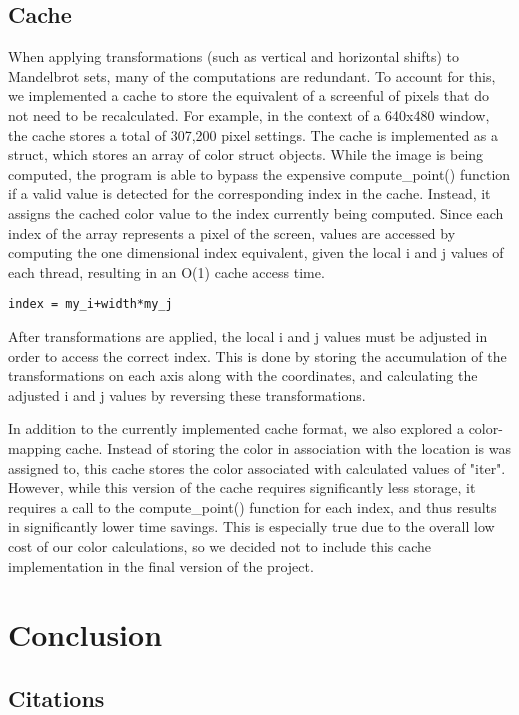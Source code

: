 \documentclass{article}
\begin{document}
\subsection{Cache}

When applying transformations (such as vertical and horizontal shifts) to Mandelbrot sets, many of the computations are redundant. To account for this, we implemented a cache to store the equivalent of a screenful of pixels that do not need to be recalculated. For example, in the context of a 640x480 window, the cache stores a total of 307,200 pixel settings. The cache is implemented as a struct, which stores an array of color struct objects. While the image is being computed, the program is able to bypass the expensive compute\_point() function if a valid value is detected for the corresponding index in the cache. Instead, it assigns the cached color value to the index currently being computed. Since each index of the array represents a pixel of the screen, values are accessed by computing the one dimensional index equivalent, given the local i and j values of each thread, resulting in an O(1) cache access time. 

\begin{verbatim}
index = my_i+width*my_j
\end{verbatim}

After transformations are applied, the local i and j values must be adjusted in order to access the correct index. This is done by storing the accumulation of the transformations on each axis along with the coordinates, and calculating the adjusted i and j values by reversing these transformations. 

In addition to the currently implemented cache format, we also explored a color-mapping cache. Instead of storing the color in association with the location is was assigned to, this cache stores the color associated with calculated values of "iter". However, while this version of the cache requires significantly less storage, it requires a call to the compute\_point() function for each index, and thus results in significantly lower time savings. This is especially true due to the overall low cost of our color calculations, so we decided not to include this cache implementation in the final version of the project.

\section{Conclusion}

\begin{center}


\section*{Citations}

\end{center}
\end{document}
